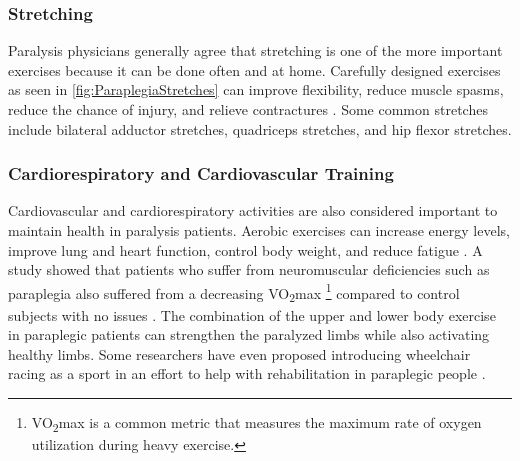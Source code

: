 \subsubsection{Stretching}
Paralysis physicians generally agree that stretching is one of the more important exercises \cite{RehabParaplegia} because it can be done often and at home. Carefully designed exercises as seen in \autoref{fig:ParaplegiaStretches} can improve flexibility, reduce muscle spasms, reduce the chance of injury, and relieve contractures \cite{ParalysisStretchingWeightLoadingPMID} \cite{ParalysisStretchingHarvey} \cite{ParalysisStretchingMichigan}. Some common stretches include bilateral adductor stretches, quadriceps stretches, and hip flexor stretches.

\subsubsection{Cardiorespiratory and Cardiovascular Training}
Cardiovascular and cardiorespiratory activities are also considered important to maintain health in paralysis patients. Aerobic exercises can increase energy levels, improve lung and heart function, control body weight, and reduce fatigue \cite{RehabParaplegia} \cite{AerobicCapacityParaplegia}. A study showed that patients who suffer from neuromuscular deficiencies such as paraplegia also suffered from a decreasing VO\textsubscript{2}max \footnote{VO\textsubscript{2}max is a common metric that measures the maximum rate of oxygen utilization during heavy exercise.} compared to control subjects with no issues \cite{AerobicCapacityParaplegia}. The combination of the upper and lower body exercise in paraplegic patients can strengthen the paralyzed limbs while also activating healthy limbs. Some researchers have even proposed introducing wheelchair racing as a sport in an effort to help with rehabilitation in paraplegic people \cite{WheelchairRacingParaplegia}.

